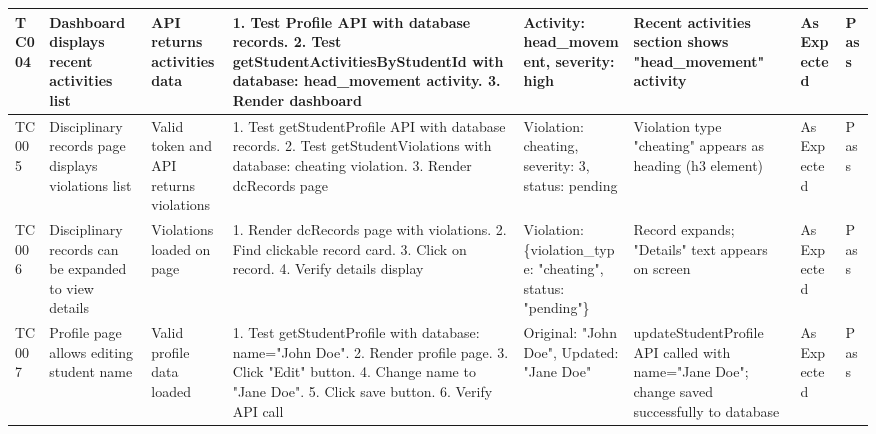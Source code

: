 \begin{table}[H]
{\begin{tabular}{|p{0.8cm}|p{1.8cm}|p{1.5cm}|p{2.5cm}|p{1.5cm}|p{2cm}|p{1.2cm}|p{0.8cm}|}
        \hline
        TC004 & Dashboard displays recent activities list & API returns activities data & 1. Test Profile API with database records. 
        2. Test getStudentActivitiesByStudentId with database: head\_movement activity. 
        3. Render dashboard & Activity: head\_movement, severity: high & Recent activities section shows "head\_movement" activity & As Expected & Pass \\
        \hline
        TC005 & Disciplinary records page displays violations list & Valid token and API returns violations & 1. Test getStudentProfile API with database records. 
        2. Test getStudentViolations with database: cheating violation. 
        3. Render dcRecords page & Violation: cheating, severity: 3, status: pending & Violation type "cheating" appears as heading (h3 element) & As Expected & Pass \\
        \hline
        TC006 & Disciplinary records can be expanded to view details & Violations loaded on page & 1. Render dcRecords page with violations. 
        2. Find clickable record card. 
        3. Click on record. 
        4. Verify details display & Violation: \{violation\_type: "cheating", status: "pending"\} & Record expands; "Details" text appears on screen & As Expected & Pass \\
        \hline
        TC007 & Profile page allows editing student name & Valid profile data loaded & 1. Test getStudentProfile with database: name="John Doe". 
        2. Render profile page. 
        3. Click "Edit" button. 
        4. Change name to "Jane Doe". 
        5. Click save button. 
        6. Verify API call & Original: "John Doe", Updated: "Jane Doe" & updateStudentProfile API called with name="Jane Doe"; change saved successfully to database & As Expected & Pass \\
        \hline
    \end{tabular}%
    }
\end{table}
